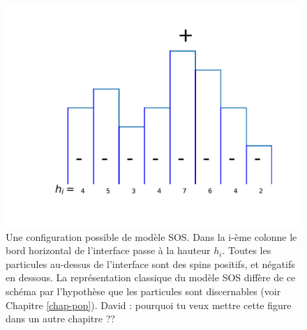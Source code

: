 \begin{figure}
	\centering
	\includegraphics[scale=1]{isingtosos/sos-indiscernable.pdf}
	\caption{Une configuration possible de modèle SOS. Dans la i-ème colonne le bord horizontal de l'interface passe à la hauteur $h_i$. Toutes les particules au-dessus de l'interface sont des spins positifs, et négatifs en dessous. La représentation classique du modèle SOS diffère de ce schéma par l'hypothèse que les particules sont discernables (voir Chapitre \ref{chap-pop}).
	{\color{red} David : pourquoi tu veux mettre cette figure dans un autre chapitre ??}}
    \label{figure-sos}
\end{figure}

